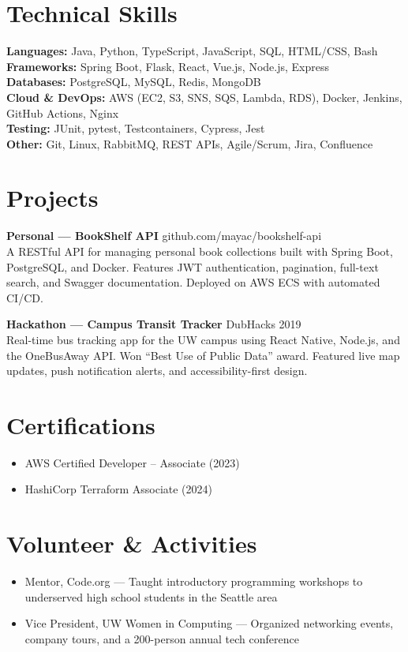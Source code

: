 \documentclass[11pt,a4paper]{article}
\begin{document}
\section*{Technical Skills}
\textbf{Languages:} Java, Python, TypeScript, JavaScript, SQL, HTML/CSS, Bash \\
\textbf{Frameworks:} Spring Boot, Flask, React, Vue.js, Node.js, Express \\
\textbf{Databases:} PostgreSQL, MySQL, Redis, MongoDB \\
\textbf{Cloud \& DevOps:} AWS (EC2, S3, SNS, SQS, Lambda, RDS), Docker, Jenkins, GitHub Actions, Nginx \\
\textbf{Testing:} JUnit, pytest, Testcontainers, Cypress, Jest \\
\textbf{Other:} Git, Linux, RabbitMQ, REST APIs, Agile/Scrum, Jira, Confluence

\section*{Projects}

\textbf{Personal --- BookShelf API} \hfill github.com/mayac/bookshelf-api \\
A RESTful API for managing personal book collections built with Spring Boot, PostgreSQL, and Docker. Features JWT authentication, pagination, full-text search, and Swagger documentation. Deployed on AWS ECS with automated CI/CD.

\textbf{Hackathon --- Campus Transit Tracker} \hfill DubHacks 2019 \\
Real-time bus tracking app for the UW campus using React Native, Node.js, and the OneBusAway API. Won ``Best Use of Public Data'' award. Featured live map updates, push notification alerts, and accessibility-first design.

\section*{Certifications}
\begin{itemize}[leftmargin=*]
  \item AWS Certified Developer -- Associate (2023)
  \item HashiCorp Terraform Associate (2024)
\end{itemize}

\section*{Volunteer \& Activities}
\begin{itemize}[leftmargin=*]
  \item Mentor, Code.org --- Taught introductory programming workshops to underserved high school students in the Seattle area
  \item Vice President, UW Women in Computing --- Organized networking events, company tours, and a 200-person annual tech conference
\end{itemize}
\end{document}
